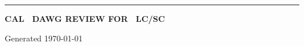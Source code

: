 \begin{center}

\begin{figure}[h!]
\hfill
{}
\end{figure}

\hrule

\vspace{2in}

{\Huge {\bf CAL \swversion\ DAWG REVIEW FOR \quarter\ LC/SC}}

\vspace{1in}

{\huge Generated \today}
\end{center}
